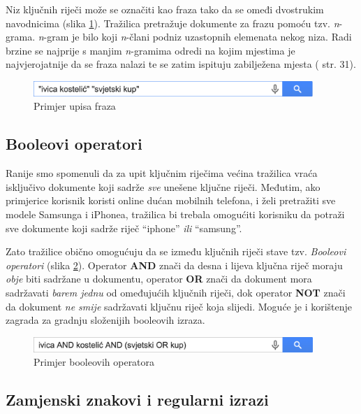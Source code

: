 \documentclass[a4paper,twoside,12pt]{scrreprt}
\begin{document}
Niz ključnih riječi može se označiti kao fraza tako da se omeđi dvostrukim navodnicima (slika \ref{phrases}). Tražilica pretražuje dokumente za frazu pomoću tzv. \textit{n}-grama. \textit{n}-gram je bilo koji \textit{n}-člani podniz uzastopnih elemenata nekog niza. Radi brzine se najprije s manjim \textit{n}-gramima odredi na kojim mjestima je najvjerojatnije da se fraza nalazi te se zatim ispituju zabilježena mjesta (\cite{taming} str. 31).

\begin{figure}[H]
  \centering
  \includegraphics[width=300pt]{phrases}
  \caption{Primjer upisa fraza}
  \label{phrases}
\end{figure}

\subsection{Booleovi operatori}

Ranije smo spomenuli da za upit ključnim riječima većina tražilica vraća isključivo dokumente koji sadrže \textit{sve} unešene ključne riječi. Međutim, ako primjerice korisnik koristi online dućan mobilnih telefona, i želi pretražiti sve modele Samsunga i iPhonea, tražilica bi trebala omogućiti korisniku da potraži sve dokumente koji sadrže riječ ``iphone'' \textit{ili} ``samsung''.

Zato tražilice obično omogućuju da se između ključnih riječi stave tzv. \textit{Booleovi operatori} (slika \ref{boolean}). Operator \textbf{AND} znači da desna i lijeva ključna riječ moraju \textit{obje} biti sadržane u dokumentu, operator \textbf{OR} znači da dokument mora sadržavati \textit{barem jednu} od omeđujućih ključnih riječi, dok operator \textbf{NOT} znači da dokument \textit{ne smije} sadržavati ključnu riječ koja slijedi. Moguće je i korištenje zagrada za gradnju složenijih booleovih izraza.

\begin{figure}[H]
  \centering
  \includegraphics[width=300pt]{boolean}
  \caption{Primjer booleovih operatora}
  \label{boolean}
\end{figure}

\subsection{Zamjenski znakovi i regularni izrazi}
\end{document}
